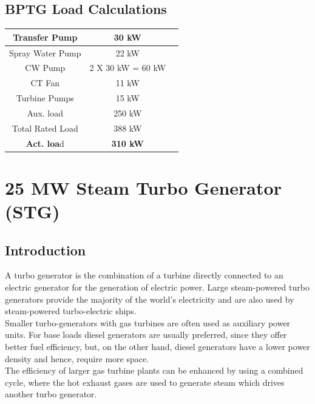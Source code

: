 \documentclass[english,11pt]{report}
\begin{document}
\section{BPTG Load Calculations}
\begin{center}
\begin{tabular}{ |c|c|c| } 
 \hline
 Transfer Pump & 30 kW \\ \hline
 Spray Water Pump & 22 kW \\ \hline
 CW Pump & 2 X 30 kW = 60 kW \\ \hline
 CT Fan & 11 kW \\ \hline
 Turbine Pumps & 15 kW \\ \hline
 Aux. load & 250 kW \\ \hline
 Total Rated Load & 388 kW \\ \hline
 \textbf{Act. loa}d & \textbf{310 kW} \\ \hline
\end{tabular}
\end{center}

\chapter{25 MW Steam Turbo Generator (STG)}
\section{Introduction}
A turbo generator is the combination of a turbine directly connected to an electric generator for the generation of electric power. Large steam-powered turbo generators provide the majority of the world's electricity and are also used by steam-powered turbo-electric ships.\\
Smaller turbo-generators with gas turbines are often used as auxiliary power units. For base loads diesel generators are usually preferred, since they offer better fuel efficiency, but, on the other hand, diesel generators have a lower power density and hence, require more space.\\
The efficiency of larger gas turbine plants can be enhanced by using a combined cycle, where the hot exhaust gases are used to generate steam which drives another turbo generator.
\end{document}

